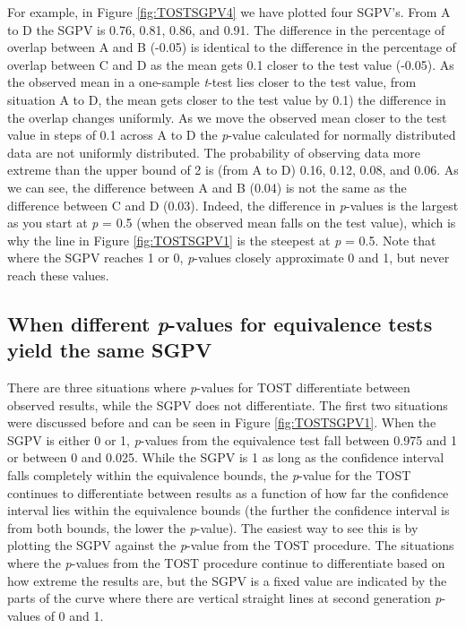 \documentclass[,man,floatsintext]{apa6}
\begin{document}
For example, in Figure \ref{fig:TOSTSGPV4} we have plotted four SGPV's.
From A to D the SGPV is 0.76, 0.81, 0.86, and 0.91. The difference in
the percentage of overlap between A and B (-0.05) is identical to the
difference in the percentage of overlap between C and D as the mean gets
0.1 closer to the test value (-0.05). As the observed mean in a
one-sample \emph{t}-test lies closer to the test value, from situation A
to D, the mean gets closer to the test value by 0.1) the difference in
the overlap changes uniformly. As we move the observed mean closer to
the test value in steps of 0.1 across A to D the \emph{p}-value
calculated for normally distributed data are not uniformly distributed.
The probability of observing data more extreme than the upper bound of 2
is (from A to D) 0.16, 0.12, 0.08, and 0.06. As we can see, the
difference between A and B (0.04) is not the same as the difference
between C and D (0.03). Indeed, the difference in \emph{p}-values is the
largest as you start at \emph{p} = 0.5 (when the observed mean falls on
the test value), which is why the line in Figure \ref{fig:TOSTSGPV1} is
the steepest at \emph{p} = 0.5. Note that where the SGPV reaches 1 or 0,
\emph{p}-values closely approximate 0 and 1, but never reach these
values.

\subsection{\texorpdfstring{When different \emph{p}-values for
equivalence tests yield the same
SGPV}{When different p-values for equivalence tests yield the same SGPV}}\label{when-different-p-values-for-equivalence-tests-yield-the-same-sgpv}

There are three situations where \emph{p}-values for TOST differentiate
between observed results, while the SGPV does not differentiate. The
first two situations were discussed before and can be seen in Figure
\ref{fig:TOSTSGPV1}. When the SGPV is either 0 or 1, \emph{p}-values
from the equivalence test fall between 0.975 and 1 or between 0 and
0.025. While the SGPV is 1 as long as the confidence interval falls
completely within the equivalence bounds, the \emph{p}-value for the
TOST continues to differentiate between results as a function of how far
the confidence interval lies within the equivalence bounds (the further
the confidence interval is from both bounds, the lower the
\emph{p}-value). The easiest way to see this is by plotting the SGPV
against the \emph{p}-value from the TOST procedure. The situations where
the \emph{p}-values from the TOST procedure continue to differentiate
based on how extreme the results are, but the SGPV is a fixed value are
indicated by the parts of the curve where there are vertical straight
lines at second generation \emph{p}-values of 0 and 1.
\end{document}
